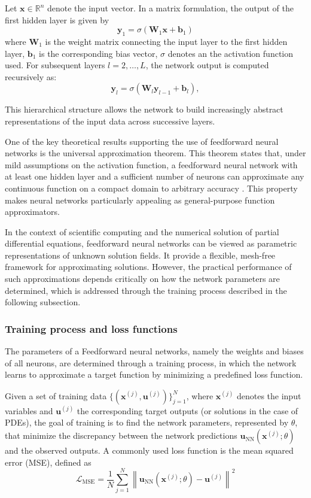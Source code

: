 \documentclass[final,1p,times]{elsarticle}
\theoremstyle{definition}
\begin{document}
Let $\mathbf{x} \in \mathbb{R}^n$ denote the input vector. In a matrix formulation, the output of the first hidden layer is given by
\[
\mathbf{y}_1 = \sigma\!\left( \mathbf{W}_1 \mathbf{x} + \mathbf{b}_1 \right)
\]
where $\mathbf{W}_1$ is the weight matrix connecting the input layer to the first hidden layer, $\mathbf{b}_1$ is the corresponding bias vector, $\sigma$ denotes an the activation function used. For subsequent layers $l = 2, \dots, L$, the network output is computed recursively as:
\[
\mathbf{y}_l = \sigma\!\left( \mathbf{W}_l \mathbf{y}_{l-1} + \mathbf{b}_l \right),
\]

This hierarchical structure allows the network to build increasingly abstract representations of the input data across successive layers.

One of the key theoretical results supporting the use of feedforward neural networks is the universal approximation theorem. This theorem states that, under mild assumptions on the activation function, a feedforward neural network with at least one hidden layer and a sufficient number of neurons can approximate any continuous function on a compact domain to arbitrary accuracy \cite{DeVore2021NNApproxSurvey}. This property makes neural networks particularly appealing as general-purpose function approximators.

In the context of scientific computing and the numerical solution of partial differential equations, feedforward neural networks can be viewed as parametric representations of unknown solution fields. It provide a flexible, mesh-free framework for approximating solutions. However, the practical performance of such approximations depends critically on how the network parameters are determined, which is addressed through the training process described in the following subsection.

\subsubsection{Training process and loss functions}

The parameters of a Feedforward neural networks, namely the weights and biases of all neurons, are determined through a training process, in which the network learns to approximate a target function by minimizing a predefined loss function.

Given a set of training data $\{(\mathbf{x}^{(j)}, \mathbf{u}^{(j)})\}_{j=1}^{N}$, where $\mathbf{x}^{(j)}$ denotes the input variables and $\mathbf{u}^{(j)}$ the corresponding target outputs (or solutions in the case of PDEs), the goal of training is to find the network parameters, represented by $\theta$, that minimize the discrepancy between the network predictions $\mathbf{u}_{\mathrm{NN}}(\mathbf{x}^{(j)};\theta)$ and the observed outputs. A commonly used loss function is the mean squared error (MSE), defined as
\[
\mathcal{L}_{\mathrm{MSE}} =
\frac{1}{N} \sum_{j=1}^{N}
\left\| \mathbf{u}_{\mathrm{NN}}(\mathbf{x}^{(j)};\theta) - \mathbf{u}^{(j)} \right\|^2
\]
\end{document}
